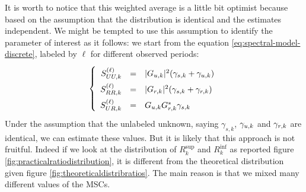 It is worth to notice that this weighted average is a little bit optimist because based on the assumption that the distribution is identical and the estimates independent.
We might be tempted to use this assumption to identify the parameter of interest as it follows: we start from the equation \eqref{eq:spectral-model-discrete}, labeled by $\ell$ for different observed periods:
\begin{eqnarray}
\label{eq:spectral-model-discrete-ell}
\left\{
\renewcommand\arraystretch{1.6}
\begin{array}{rcl}
S_{UU,k}^{(\ell)}&=&|G_{\ut,k}|^{2} (\gamma_{s,k}+\gamma_{\ut,k})
\\
S_{RR,k}^{(\ell)}&=&|G_{\rf,k}|^{2} (\gamma_{s,k}+\gamma_{\rf,k})
\\
S_{UR,k}^{(\ell)}&=&G_{\ut,k}G^{*}_{\rf,k}\gamma_{s,k}
\end{array}
\right.
\end{eqnarray}
Under the assumption that the unlabeled unknown, saying $\gamma_{s,k}$, $\gamma_{{u},k}$  and
$\gamma_{{r},k}$ are identical, we can estimate these values. But it is likely that this approach is not fruitful. Indeed if we look at the distribution of  $R_{k}^{\sup}$ and $R_{k}^{\inf}$  as reported figure \ref{fig:practicalratiodistribution}, it is different from the theoretical distribution given figure \ref{fig:theoreticaldistribratios}. The  main reason is that we mixed many different values of the MSCs.



